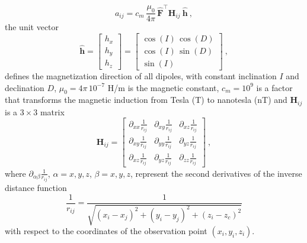 \begin{equation}
a_{ij}
= c_{m} \, \frac{\mu_{0}}{4\pi} \, \hat{\mathbf{F}}^{\top} \mathbf{H}_{ij} \: \hat{\mathbf{h}} \: ,
\label{eq:aij_mag}
\end{equation}
the unit vector
\begin{equation}
\hat{\mathbf{h}} = \begin{bmatrix}
h_x \\
h_y \\
h_z
\end{bmatrix} =
\begin{bmatrix}
\cos(I) \, \cos(D) \\
\cos(I) \, \sin(D) \\
\sin(I)
\end{bmatrix} \: ,
\label{eq:h_hat}
\end{equation}
defines the magnetization direction of all dipoles, with constant inclination $I$ and declination $D$,
$\mu_{0} = 4\pi \, 10^{-7}$ H/m is the magnetic constant, $c_{m} = 10^{9}$ is a factor that transforms
the magnetic induction from Tesla (T) to nanotesla (nT) and $\mathbf{H}_{ij}$ is a $3 \times 3$ matrix 
\begin{equation}
\mathbf{H}_{ij} = \begin{bmatrix}
\partial_{xx} \frac{1}{r_{ij}} & 
\partial_{xy} \frac{1}{r_{ij}} & 
\partial_{xz} \frac{1}{r_{ij}} \\
\partial_{xy} \frac{1}{r_{ij}} & 
\partial_{yy} \frac{1}{r_{ij}} & 
\partial_{yz} \frac{1}{r_{ij}} \\
\partial_{xz} \frac{1}{r_{ij}} & 
\partial_{yz} \frac{1}{r_{ij}} & 
\partial_{zz} \frac{1}{r_{ij}}
\end{bmatrix} \: ,
\label{eq:Hij}
\end{equation}
where $\partial_{\alpha\beta} \frac{1}{r_{ij}}$, $\alpha = x, y, z$, $\beta = x, y, z$, 
represent the second derivatives of the inverse distance function
\begin{equation}
\frac{1}{r_{ij}} = 
\frac{1}{\sqrt{\left(x_{i} - x_{j} \right)^{2} + 
\left(y_{i} - y_{j} \right)^{2} + \left(z_{i} - z_{c} \right)^{2}}}
\label{eq:1_rij}
\end{equation}
with respect to the coordinates of the observation point $(x_{i}, y_{i}, z_{i})$.

